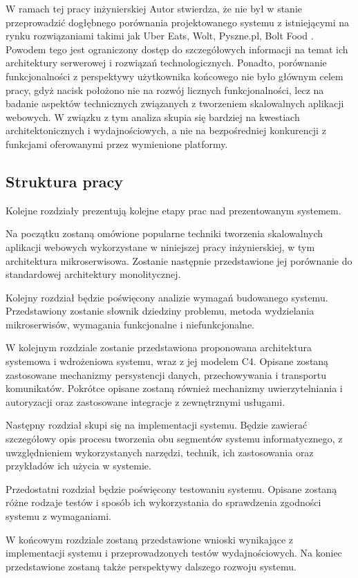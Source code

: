 W ramach tej pracy inżynierskiej Autor stwierdza, że nie był w stanie przeprowadzić dogłębnego porównania projektowanego systemu z istniejącymi na rynku rozwiązaniami takimi jak Uber Eats, Wolt, Pyszne.pl, Bolt Food \cite{fooddeliveryapps}. Powodem tego jest ograniczony dostęp do szczegółowych informacji na temat ich architektury serwerowej i rozwiązań technologicznych. Ponadto, porównanie funkcjonalności z perspektywy użytkownika końcowego nie było głównym celem pracy, gdyż nacisk położono nie na rozwój licznych funkcjonalności, lecz na badanie aspektów technicznych związanych z tworzeniem skalowalnych aplikacji webowych. W związku z tym analiza skupia się bardziej na kwestiach architektonicznych i wydajnościowych, a nie na bezpośredniej konkurencji z funkcjami oferowanymi przez wymienione platformy.


\subsection{Struktura pracy}

Kolejne rozdziały prezentują kolejne etapy prac nad prezentowanym systemem.

Na początku zostaną omówione popularne techniki tworzenia skalowalnych aplikacji webowych wykorzystane w niniejszej pracy inżynierskiej, w tym architektura mikroserwisowa. Zostanie następnie przedstawione jej porównanie do standardowej architektury monolitycznej.

Kolejny rozdział będzie poświęcony analizie wymagań budowanego systemu. Przedstawiony zostanie słownik dziedziny problemu, metoda wydzielania mikroserwisów, wymagania funkcjonalne i niefunkcjonalne.

W kolejnym rozdziale zostanie przedstawiona proponowana architektura systemowa i wdrożeniowa systemu, wraz z jej modelem C4. Opisane zostaną zastosowane mechanizmy persystencji danych, przechowywania i transportu komunikatów. Pokrótce opisane zostaną również mechanizmy uwierzytelniania i autoryzacji oraz zastosowane integracje z zewnętrznymi usługami.

Następny rozdział skupi się na implementacji systemu. Będzie zawierać szczegółowy opis procesu tworzenia obu segmentów systemu informatycznego, z uwzględnieniem wykorzystanych narzędzi, technik, ich zastosowania oraz przykładów ich użycia w systemie.

Przedostatni rozdział będzie poświęcony testowaniu systemu. Opisane zostaną różne rodzaje testów i sposób ich wykorzystania do sprawdzenia zgodności systemu z wymaganiami.

W końcowym rozdziale zostaną przedstawione wnioski wynikające z implementacji systemu i przeprowadzonych testów wydajnościowych. Na koniec przedstawione zostaną także perspektywy dalszego rozwoju systemu.